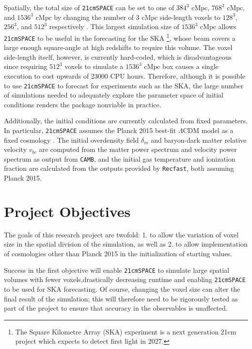 \documentclass[floats,floatfix,showpacs,amssymb,prd,superscriptaddress,nofootinbib]{revtex4-2} %
\newcommand{\code}{\texttt}
\begin{document}
Spatially, the total size of \code{21cmSPACE} can be set to one of $384^3 \text{ cMpc}$, $768^3 \text{ cMpc}$, and $1536^3 \text{ cMpc}$ by changing the number of $3 \text{ cMpc}$ side-length voxels to $128^3$, $256^3$, and $512^3$ respectively \cite{dhandha_2022}. This largest simulation size of $1536^3 \text{ cMpc}$ allows \code{21cmSPACE} to be useful in the forecasting for the SKA \footnote{The Square Kilometre Array (SKA) experiment is a next generation 21cm project which expects to detect first light in 2027.}, whose beam covers a large enough square-angle at high redshifts to require this volume. The voxel side-length itself, however, is currently hard-coded, which is disadvantageous since requiring $512^3$ voxels to simulate a $1536^3 \text{ cMpc}$ box causes a single execution to cost upwards of 23000 CPU hours. Therefore, although it is possible to use \code{21cmSPACE} to forecast for experiments such as the SKA, the large number of simulations needed to adequately explore the parameter space of initial conditions renders the package nonviable in practice.


Additionally, the initial conditions are currently calculated from fixed parameters. In particular, \code{21cmSPACE} assumes the Planck 2015 best-fit $\Lambda$CDM model as a fixed cosmology \cite{Planck_2016}. The initial overdensity field $\delta_m$ and baryon-dark matter relative velocity $v_{bc}$ are computed \cite{Fialkov_2012} from the matter power spectrum and velocity power spectrum as output from \code{CAMB}, and the initial gas temperature and ionization fraction are calculated from the outputs provided by \code{Recfast}, both assuming Planck 2015.

\section{Project Objectives}

The goals of this research project are twofold: 1. to allow the variation of voxel size in the spatial division of the simulation, as well as 2. to allow implementation of cosmologies other than Planck 2015 in the initialization of starting values. 

Success in the first objective will enable \code{21cmSPACE} to simulate large spatial volumes with fewer voxels,drastically decreasing runtime and enabling \code{21cmSPACE} to be used for SKA forecasting. Of course, changing the voxel size can alter the final result of the simulation; this will therefore need to be rigorously tested as part of the project to ensure that accuracy in the observables is unaffected. 
\end{document}
